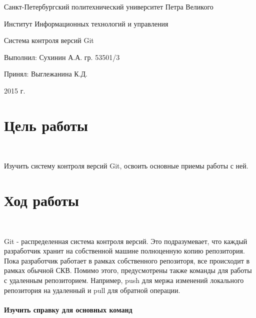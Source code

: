 \documentclass{article}
\begin{document}
\begin{titlepage} \begin{center}

	\Large			
Санкт-Петербургский политехнический университет Петра Великого
			
	\vspace{0.2cm}	
Институт Информационных технологий и управления
		
	\vspace{2cm} \vfill \huge
Система контроля версий Git		
		
	\vfill 
	\begin{flushleft} \large \hangindent=8cm 
Выполнил: Сухинин А.А. гр. 53501/3 \hrulefill
			
Принял: Выглежанина К.Д. \hrulefill
	\end{flushleft}
		
	\vspace{2cm} \vfill \LARGE
2015 г.
		
\end{center} \end{titlepage}

\section{Цель работы}
~

Изучить систему контроля версий Git, освоить основные приемы работы
с ней.

\section{Ход работы}
~

Git - распределенная система контроля версий. Это подразумевает, что каждый разработчик хранит на собственной машине полноценную копию репозитория. Пока разработчик работает в рамках собственного репозиторя, все происходит в рамках обычной СКВ. Помимо этого, предусмотрены также команды для работы с удаленным репозиторием. Например, push для мержа изменений локального репозитория на удаленный и pull для обратной операции.

\paragraph{Изучить справку для основных команд}
~
\end{document}
